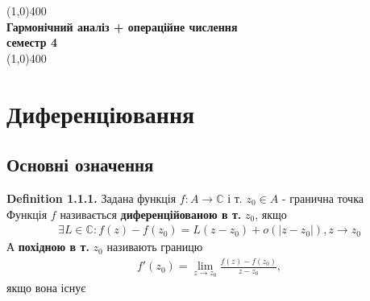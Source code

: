 \documentclass[a4paper, 14pt]{extarticle}
\begin{document}
	\begin{titlepage}
		\begin{center}
		\hfill
		\vfill
		\line(1,0){400}\\
		\large{\textbf{Гармонічний аналіз + операційне числення}}\\[1mm]
		{\textbf{семестр 4}}\\[1mm]
		\line(1,0){400}\\
		\vfill
        	\end{center}
    	\end{titlepage}
    
	\tableofcontents
	\newpage
	
	\section{Диференціювання}
	\subsection{Основні означення}
	\textbf{Definition 1.1.1.} Задана функція $f: A \rightarrow \mathbb{C}$ і т. $z_0 \in A$ - гранична точка\\
	Функція $f$ називається \textbf{диференційованою в т.} $z_0$, якщо
	\begin{align*}
	\exists L \in \mathbb{C}: f(z)-f(z_0)=L(z-z_0) + o(|z-z_0|), z \rightarrow z_0
	\end{align*}
	А \textbf{похідною в т.} $z_0$ називають границю
	\begin{align*}
	f'(z_0) = \lim_{z \to z_0} \frac{f(z)-f(z_0)}{z-z_0},
	\end{align*}
	якщо вона існує\\
	
\end{document}
